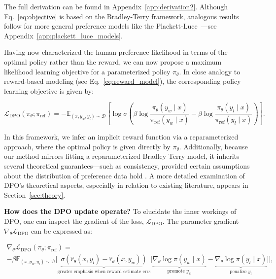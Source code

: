 The full derivation can be found in Appendix~\ref{app:derivation2}. Although Eq.~\ref{eq:objective} is based on the Bradley-Terry framework, analogous results follow for more general preference models like the Plackett-Luce~\citep{plackett1975analysis, luce2012individual}—see Appendix~\ref{app:plackett_luce_models}.

Having now characterized the human preference likelihood in terms of the optimal policy rather than the reward, we can now propose a maximum likelihood learning objective for a parameterized policy $\pi_\theta$. In close analogy to reward-based modeling (see Eq.~\ref{eq:reward_model}), the corresponding policy learning objective is given by:

\begin{equation}\label{eq:optimum_model}
    \mathcal{L}_\text{DPO}(\pi_{\theta}; \pi_\text{ref}) = -\mathbb{E}_{(x, y_w, y_l)\sim \mathcal{D}}\left[\log \sigma \left(\beta \log \frac{\pi_{\theta}(y_w\mid x)}{\pi_\text{ref}(y_w\mid x)} - \beta \log \frac{\pi_{\theta}(y_l\mid x)}{\pi_\text{ref}(y_l\mid x)}\right)\right].
\end{equation}

In this framework, we infer an implicit reward function via a reparameterized approach, where the optimal policy is given directly by $\pi_\theta$. Additionally, because our method mirrors fitting a reparameterized Bradley-Terry model, it inherits several theoretical guarantees—such as consistency, provided certain assumptions about the distribution of preference data hold \cite{bong2022generalized}. A more detailed examination of DPO’s theoretical aspects, especially in relation to existing literature, appears in Section~\ref{sec:theory}.

\textbf{How does the DPO update operate?} To elucidate the inner workings of DPO, one can inspect the gradient of the loss, $\mathcal{L}_\text{DPO}$. The parameter gradient $\nabla_\theta \mathcal{L}_\text{DPO}$ can be expressed as:

\begin{multline*}\label{eq:gradient}
    \nabla_\theta \mathcal{L}_\text{DPO}(\pi_\theta;\pi_\text{ref}) = \\ -\beta\mathbb{E}_{(x, y_w, y_l) \sim \mathcal{D}} \bigg[\underbrace{\sigma(\hat{r}_\theta(x, y_l) - \hat{r}_\theta (x, y_w))}_\text{greater emphasis when reward estimate errs}\bigg[\underbrace{\nabla_\theta\log \pi(y_w \mid x)}_\text{promote $y_w$} - \underbrace{\nabla_\theta\log\pi(y_l \mid x)}_\text{penalize $y_l$}\bigg]\bigg],
\end{multline*}

